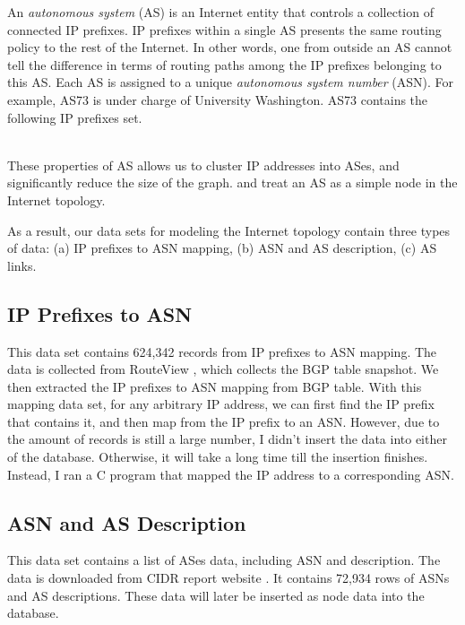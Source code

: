 \documentclass[letterpaper,twocolumn,11pt]{article}
\begin{document}
{An {\it autonomous system} (AS) is an Internet entity that controls a collection of connected IP prefixes. IP prefixes within a single AS presents the same routing policy to the rest of the Internet. In other words, one from outside an AS cannot tell the difference in terms of routing paths among the IP prefixes belonging to this AS. Each AS is assigned to a unique {\it autonomous system number} (ASN). For example, AS73 is under charge of University Washington. AS73 contains the following IP prefixes set.

\hspace{8pt}
\vspace{6pt} \\ 
These properties of AS allows us to cluster IP addresses into ASes, and significantly reduce the size of the graph. and treat an AS as a simple node in the Internet topology.

As a result, our data sets for modeling the Internet topology contain three types of data: (a) IP prefixes to ASN mapping, (b) ASN and AS description, (c) AS links.

\subsection{IP Prefixes to ASN}
This data set contains 624,342 records from IP prefixes to ASN mapping. The data is collected from RouteView \cite{routeview}, which collects the BGP table snapshot. We then extracted the IP prefixes to ASN mapping from BGP table. With this mapping data set, for any arbitrary IP address, we can first find the IP prefix that contains it, and then map from the IP prefix to an ASN. However, due to the amount of records is still a large number, I didn't insert the data into either of the database. Otherwise, it will take a long time till the insertion finishes. Instead, I ran a C program that mapped the IP address to a corresponding ASN.
\subsection{ASN and AS Description}
This data set contains a list of ASes data, including ASN and description. The data is downloaded from CIDR report website \cite{cidr} \cite{cidr-website}. It contains 72,934 rows of ASNs and AS descriptions. These data will later be inserted as node data into the database.

}
\end{document}
